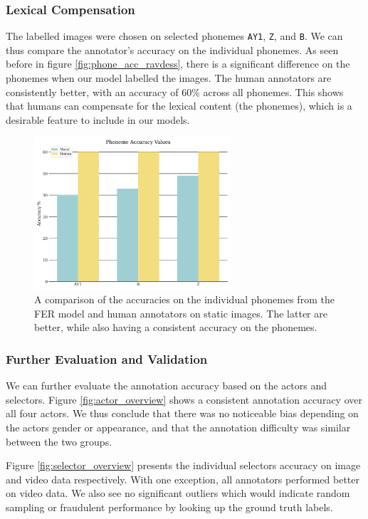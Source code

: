 \subsubsection{Lexical Compensation}
The labelled images were chosen on selected phonemes \texttt{AY1}, \texttt{Z}, and \texttt{B}. We can thus compare the annotator's accuracy on the individual phonemes. As seen before in figure \ref{fig:phone_acc_ravdess}, there is a significant difference on the phonemes when our model labelled the images. The human annotators are consistently better, with an accuracy of 60\% across all phonemes. This shows that humans can compensate for the lexical content (the phonemes), which is a desirable feature to include in our models.

\begin{figure}
    \centering
    \includegraphics[width=0.65\textwidth]{res/Phone_model_acc.png}
    \caption{A comparison of the accuracies on the individual phonemes from the FER model and human annotators on static images. The latter are better, while also having a consistent accuracy on the phonemes.}
    \label{fig:phone_model_human}
\end{figure}

\subsubsection{Further Evaluation and Validation}
We can further evaluate the annotation accuracy based on the actors and selectors. Figure \ref{fig:actor_overview} shows a consistent annotation accuracy over all four actors. We thus conclude that there was no noticeable bias depending on the actors gender or appearance, and that the annotation difficulty was similar between the two groups.

Figure \ref{fig:selector_overview} presents the individual selectors accuracy on image and video data respectively. With one exception, all annotators performed better on video data. We also see no significant outliers which would indicate random sampling or fraudulent performance by looking up the ground truth labels.

